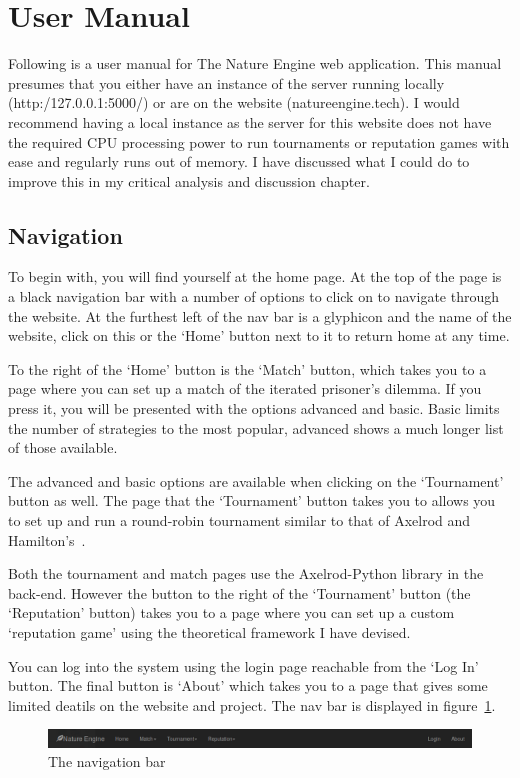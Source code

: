 \documentclass[]{final_report}
\begin{document}
\section{User Manual}
Following is a user manual for The Nature Engine web application. This manual presumes that you either have an instance of the server running locally (http:/127.0.0.1:5000/) or are on the website (natureengine.tech). I would recommend having a local instance as the server for this website does not have the required CPU processing power to run tournaments or reputation games with ease and regularly runs out of memory. I have discussed what I could do to improve this in my critical analysis and discussion chapter.

\subsection{Navigation}
To begin with, you will find yourself at the home page. At the top of the page is a black navigation bar with a number of options to click on to navigate through the website. At the furthest left of the nav bar is a glyphicon and the name of the website, click on this or the `Home' button next to it to return home at any time.\par 
To the right of the `Home' button is the `Match' button, which takes you to a page where you can set up a match of the iterated prisoner's dilemma. If you press it, you will be presented with the options advanced and basic. Basic limits the number of strategies to the most popular, advanced shows a much longer list of those available.\par 
The advanced and basic options are available when clicking on the `Tournament' button as well. The page that the `Tournament' button takes you to allows you to set up and run a round-robin tournament similar to that of Axelrod and Hamilton's~\cite{evolution_of_cooperation}.\par 
Both the tournament and match pages use the Axelrod-Python library in the back-end. However the button to the right of the `Tournament' button (the `Reputation' button) takes you to a page where you can set up a custom `reputation game' using the theoretical framework I have devised.\par 
You can log into the system using the login page reachable from the `Log In' button. The final button is `About' which takes you to a page that gives some limited deatils on the website and project. The nav bar is displayed in figure~\ref{fig:navbar}.
\begin{figure}
	\includegraphics[width=\textwidth]{NavBar.png}
	\caption{The navigation bar}
	\label{fig:navbar}
\end{figure}
\end{document}

